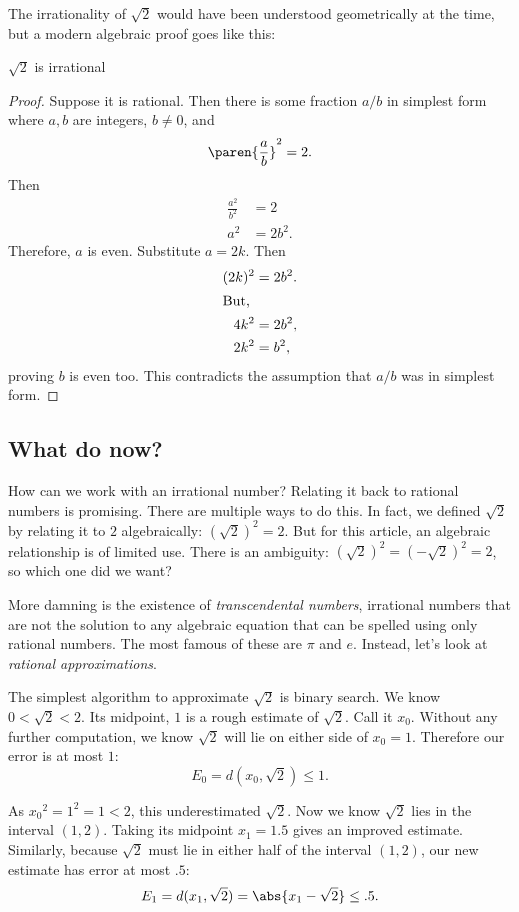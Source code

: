 \documentclass{scrartcl}
\newcommand{\dist}{d}
\begin{document}
The irrationality of \(\sqrt 2\) would have been understood geometrically at the time, but a modern algebraic proof goes like this:
\begin{theorem}\(\sqrt 2\) is irrational
\end{theorem}
\begin{proof}
  Suppose it is rational. Then there is some fraction \(a/b\) in simplest form where \(a,b\) are integers, \(b\neq 0\), and
  \[
    \paren{\frac a b}^{2}=2.
  \]
  Then
  \begin{align*}
    \frac{a^{2}}{b^{2}} &= 2 \\
    a^{2}&= 2 b^{2}.
  \end{align*}
  Therefore, \(a\) is even. Substitute \(a=2k\). Then
  \begin{align}
    (2k)^{2} &=2 b^{2}. \\
                      \shortintertext{But,}
    4k^{2} &= 2b^{2}, \\
    2k^{2} &= b^{2},
  \end{align}
  proving \(b\) is even too. This contradicts the assumption that \(a/b\) was in simplest form.
\end{proof}

\subsection{What do now?}
How can we work with an irrational number? Relating it back to rational numbers is promising. There are multiple ways to do this. In fact, we defined \(\sqrt 2\) by relating it to \(2\) algebraically: \((\sqrt 2)^2 = 2\). But for this article, an algebraic relationship is of limited use. There is an ambiguity: \((\sqrt 2)^{2} = (-\sqrt 2)^{2} = 2\), so which one did we want?

More damning is the existence of \emph{transcendental numbers}, irrational numbers that are not the solution to any algebraic equation that can be spelled using only rational numbers. The most famous of these are \(\pi\) and \(e\). Instead, let's look at \emph{rational approximations}.

The simplest algorithm to approximate \(\sqrt 2\) is binary search. We know \(0 < \sqrt 2 < 2\). Its midpoint, \(1\) is a rough estimate of \(\sqrt 2\). Call it \(x_{0}\). Without any further computation, we know \(\sqrt 2\) will lie on either side of \(x_{0}=1\). Therefore our error is at most \(1\):
\[
  E_{0}=\dist(x_{0},\sqrt 2) \leq 1.
\]


As \({x_{0}}^{2}=1^{2}=1 < 2\), this underestimated \(\sqrt 2\).  Now we know \(\sqrt 2\) lies in the interval \((1,2)\). Taking its midpoint \(x_{1}=1.5\) gives an improved estimate. Similarly, because \(\sqrt 2\) must lie in either half of the interval \((1,2)\), our new estimate has error at most \(.5\):
\[
  E_{1} = \dist(x_{1},\sqrt 2) = \abs{x_{1} - \sqrt 2} \leq .5.
\]
\end{document}
